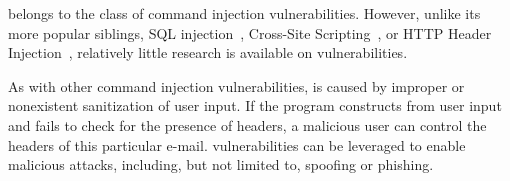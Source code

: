 \ehi belongs to the class of command injection vulnerabilities. However, unlike its more popular siblings, SQL injection~\cite{sql1,sql0,sql2}, Cross-Site Scripting~\cite{Injection1,KleinAmit}, or HTTP Header Injection~\cite{sessionride}, relatively little research is available on \ehi vulnerabilities.

As with other command injection vulnerabilities, \ehi is caused by
improper or nonexistent sanitization of user input. If the program
constructs \emails from user input and fails to check for the presence
of \email headers, a malicious user can control the headers of this particular e-mail. \ehi vulnerabilities can be leveraged to enable malicious attacks, including, but not limited to, spoofing or phishing.
